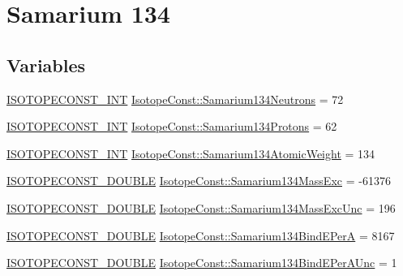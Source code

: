 \hypertarget{group___isotope_const-_samarium-_sm134}{}\section{Samarium 134}
\label{group___isotope_const-_samarium-_sm134}
\subsection*{Variables}
\begin{DoxyCompactItemize}
\item 
\mbox{\hyperlink{group___isotope_const-_macros_ga5f18360b3e99483a35c32d789e62621c}{I\+S\+O\+T\+O\+P\+E\+C\+O\+N\+S\+T\+\_\+\+I\+NT}} \mbox{\hyperlink{group___isotope_const-_samarium-_sm134_ga1265af2ac02f1dc5a048c2a4ae65d634}{Isotope\+Const\+::\+Samarium134\+Neutrons}} = 72
\item 
\mbox{\hyperlink{group___isotope_const-_macros_ga5f18360b3e99483a35c32d789e62621c}{I\+S\+O\+T\+O\+P\+E\+C\+O\+N\+S\+T\+\_\+\+I\+NT}} \mbox{\hyperlink{group___isotope_const-_samarium-_sm134_ga88a7d7bd37e3abf162272061ea1eccf2}{Isotope\+Const\+::\+Samarium134\+Protons}} = 62
\item 
\mbox{\hyperlink{group___isotope_const-_macros_ga5f18360b3e99483a35c32d789e62621c}{I\+S\+O\+T\+O\+P\+E\+C\+O\+N\+S\+T\+\_\+\+I\+NT}} \mbox{\hyperlink{group___isotope_const-_samarium-_sm134_gaa617bc43677017e6acd11bac8974bc97}{Isotope\+Const\+::\+Samarium134\+Atomic\+Weight}} = 134
\item 
\mbox{\hyperlink{group___isotope_const-_macros_ga8f45a7272ce02c0b4c65c44636ed719a}{I\+S\+O\+T\+O\+P\+E\+C\+O\+N\+S\+T\+\_\+\+D\+O\+U\+B\+LE}} \mbox{\hyperlink{group___isotope_const-_samarium-_sm134_gabe20c1f5edc835d05b8cd90da8f85fe3}{Isotope\+Const\+::\+Samarium134\+Mass\+Exc}} = -\/61376
\item 
\mbox{\hyperlink{group___isotope_const-_macros_ga8f45a7272ce02c0b4c65c44636ed719a}{I\+S\+O\+T\+O\+P\+E\+C\+O\+N\+S\+T\+\_\+\+D\+O\+U\+B\+LE}} \mbox{\hyperlink{group___isotope_const-_samarium-_sm134_ga92df68505c7a766147aa4f3176ff574e}{Isotope\+Const\+::\+Samarium134\+Mass\+Exc\+Unc}} = 196
\item 
\mbox{\hyperlink{group___isotope_const-_macros_ga8f45a7272ce02c0b4c65c44636ed719a}{I\+S\+O\+T\+O\+P\+E\+C\+O\+N\+S\+T\+\_\+\+D\+O\+U\+B\+LE}} \mbox{\hyperlink{group___isotope_const-_samarium-_sm134_gafc7b5c312de3ab2acc0e337d86f7df46}{Isotope\+Const\+::\+Samarium134\+Bind\+E\+PerA}} = 8167
\item 
\mbox{\hyperlink{group___isotope_const-_macros_ga8f45a7272ce02c0b4c65c44636ed719a}{I\+S\+O\+T\+O\+P\+E\+C\+O\+N\+S\+T\+\_\+\+D\+O\+U\+B\+LE}} \mbox{\hyperlink{group___isotope_const-_samarium-_sm134_gad374ef0f0360e1d3b42176a2d13efcaa}{Isotope\+Const\+::\+Samarium134\+Bind\+E\+Per\+A\+Unc}} = 1

\end{DoxyCompactItemize}
